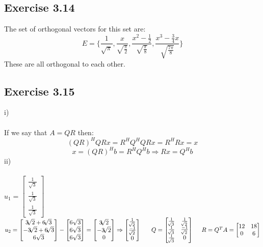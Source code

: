 \documentclass[letterpaper,12pt]{article}
\theoremstyle{definition}
\begin{document}
\subsection*{Exercise 3.14}
The set of orthogonal vectors for this set are:
\[E=\{\frac{1}{\sqrt{\pi}},\frac{x}{\sqrt{\frac{\pi}{2}}},\frac{x^2-\frac{1}{2}}{\sqrt{\frac{\pi}{8}}},\frac{x^3-\frac{3}{4}x}{\sqrt{\frac{7\pi}{8}}}\}\]
These are all orthogonal to each other.

\subsection*{Exercise 3.15}
i) \\ \\
If we say that $A = QR$ then:
\[  (QR)^{H}QRx = R^HQ^HQRx = R^HRx = x  \]
\[  x = (QR)^Hb = R^HQ^Hb \Rightarrow Rx = Q^Hb  \]
ii) \\ \\
$u_1 = \begin{bmatrix} \frac{1}{\sqrt{3}}\\ \frac{1}{\sqrt{3}}\\ \frac{1}{\sqrt{3}}
\end{bmatrix}$ ~~~~~
$u_2 = \begin{bmatrix} 
3\sqrt[]{2}+6\sqrt[]{3}\\
-3\sqrt[]{2}+6\sqrt[]{3}\\
6\sqrt{3}
\end{bmatrix} - \begin{bmatrix} 6\sqrt{3}\\ 6\sqrt{3}\\ 6\sqrt{3}
\end{bmatrix}
=\begin{bmatrix}
3\sqrt[]{2}\\-3\sqrt[]{2}\\ 0
\end{bmatrix}
\Rightarrow \begin{bmatrix}
\frac{1}{\sqrt[]{2}}\\
\frac{-1}{\sqrt[]{2}}\\ 0
\end{bmatrix}\\
~~~~~Q = \begin{bmatrix}
\frac{1}{\sqrt[]{3}} & \frac{1}{\sqrt[]{2}}\\
\frac{1}{\sqrt[]{3}} & \frac{-1}{\sqrt[]{2}}\\
\frac{1}{\sqrt[]{3}} & 0 
\end{bmatrix}~~~~
R = Q^TA = \begin{bmatrix}
12 & 18\\
0 & 6
\end{bmatrix}
$
\end{document}
